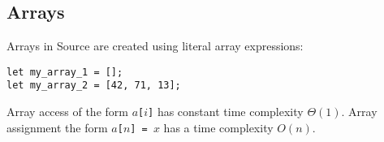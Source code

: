 \subsection*{Arrays}

Arrays in Source are created using literal array expressions:
\begin{lstlisting}
let my_array_1 = [];
let my_array_2 = [42, 71, 13];
\end{lstlisting}
Array access of the form $a$\lstinline{[}$i$\lstinline{]} has constant time complexity $\Theta(1)$.
Array assignment the form $a$\lstinline{[}$n$\lstinline{] = }$x$ has a time complexity
$O(n)$.
